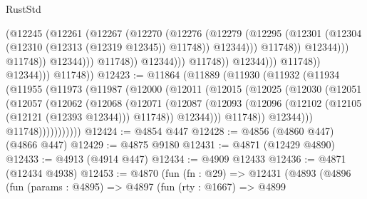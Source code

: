\begin{lexlean}{RustStd}
\begin{coremodule}
                                                (@12245
                                                  (@12261
                                                    (@12267
                                                      (@12270
                                                        (@12276
                                                          (@12279
                                                            (@12295
                                                              (@12301
                                                                (@12304
                                                                  (@12310
                                                                    (@12313 (@12319 @12345))
                                                                    @11748))
                                                                @12344)))
                                                          @11748))
                                                      @12344)))
                                                @11748))
                                            @12344)))
                                      @11748))
                                  @12344)))
                            @11748))
                        @12344)))
                  @11748))
              @12344)))
        @11748))
@12423 := @11864
    (@11889
      (@11930
        (@11932
          (@11934
            (@11955
              (@11973
                (@11987
                  (@12000
                    (@12011
                      (@12015
                        (@12025
                          (@12030
                            (@12051
                              (@12057
                                (@12062
                                  (@12068
                                    (@12071
                                      (@12087
                                        (@12093
                                          (@12096 (@12102 (@12105 (@12121 (@12393 @12344))) @11748))
                                          @12344)))
                                    @11748))
                                @12344)))
                          @11748)))))))))))
@12424 := @4854 @447
@12428 := @4856 (@4860 @447) (@4866 @447)
@12429 := @4875 @9180
@12431 := @4871 (@12429 @4890)
@12433 := @4913 (@4914 @447)
@12434 := @4909 @12433
@12436 := @4871 (@12434 @4938)
@12453 := @4870
    (fun (fn : @29) =>
    @12431
      (@4893
        (@4896
          (fun (params : @4895) =>
          @4897
            (fun (rty : @1667) =>
            @4899

\end{coremodule}
\end{lexlean}
